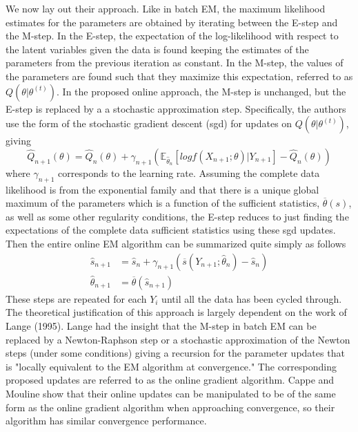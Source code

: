 \documentclass[12pt]{article}
\begin{document}
We now lay out their approach. Like in batch EM, the maximum likelihood estimates for the parameters are obtained by iterating between the E-step and the M-step. In the E-step, the expectation of the log-likelihood with respect to the latent variables given the data is found keeping the estimates of the parameters from the previous iteration as constant. In the M-step, the values of the parameters are found such that they maximize this expectation, referred to as $Q(\theta | \theta^{(t)})$. In the proposed online approach, the M-step is unchanged, but the E-step is replaced by a a stochastic approximation step. Specifically, the authors use the form of the stochastic gradient descent (sgd) for updates on $Q(\theta | \theta^{(t)})$, giving
\begin{equation}
\hat{Q}_{n+1}(\theta) = \hat{Q}_{n}(\theta) + \gamma_{n+1}(\mathbb{E}_{\hat{\theta}_{n}}[log f(X_{n+1};\theta)|Y_{n+1}] - \hat{Q}_{n}(\theta))
\end{equation}
where $\gamma_{n+1}$ corresponds to the learning rate. Assuming the complete data likelihood is from the exponential family and that there is a unique global maximum of the parameters which is a function of the sufficient statistics, $\overline{\theta}(s)$,  as well as some other regularity conditions, the E-step reduces to just finding the expectations of the complete data sufficient statistics using these sgd updates. Then the entire online EM algorithm can be summarized quite simply as follows
\begin{align}
\hat{s}_{n+1} &= \hat{s}_{n} + \gamma_{n+1}(\overline{s}(Y_{n+1}; \hat{\theta}_{n}) - \hat{s}_{n}) \nonumber \\
\hat{\theta}_{n+1} &= \overline{\theta}(\hat{s}_{n+1})
\end{align}
These steps are repeated for each $Y_{i}$ until all the data has been cycled through.\\

The theoretical justification of this approach is largely dependent on the work of Lange (1995). Lange had the insight that the M-step in batch EM can be replaced by a Newton-Raphson step or a stochastic approximation of the Newton steps (under some conditions) giving a recursion for the parameter updates that is "locally equivalent to the EM algorithm at convergence." The corresponding proposed updates are referred to as the online gradient algorithm. Cappe and Mouline show that their online updates can be manipulated to be of the same form as the online gradient algorithm when approaching convergence, so their algorithm has similar convergence performance. 
\end{document}
